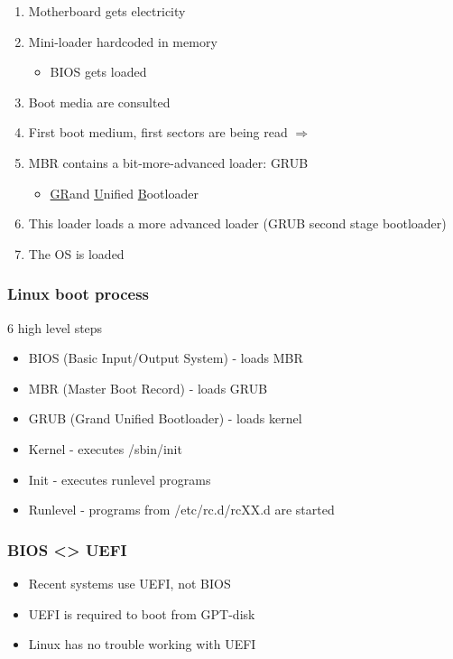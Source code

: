 \documentclass{article}
\begin{document}
\begin{enumerate}
    \item Motherboard gets electricity
    \item Mini-loader hardcoded in memory
    \begin{itemize}
        \item BIOS gets loaded
    \end{itemize}
    \item Boot media are consulted
    \item First boot medium, first sectors are being read $\Rightarrow$
    \item MBR contains a bit-more-advanced loader: GRUB
    \begin{itemize}
        \item \underline{GR}and \underline{U}nified \underline{B}ootloader
    \end{itemize}
    \item This loader loads a more advanced loader (GRUB second stage bootloader)
    \item The OS is loaded
\end{enumerate}

\subsubsection{Linux boot process}

6 high level steps

\begin{itemize}
    \item BIOS (Basic Input/Output System) - loads MBR
    \item MBR (Master Boot Record) - loads GRUB
    \item GRUB (Grand Unified Bootloader) - loads kernel
    \item Kernel - executes /sbin/init
    \item Init - executes runlevel programs
    \item Runlevel - programs from /etc/rc.d/rcXX.d are started
\end{itemize}

\subsubsection{BIOS <> UEFI}

\begin{itemize}
    \item Recent systems use UEFI, not BIOS
    \item UEFI is required to boot from GPT-disk
    \item Linux has no trouble working with UEFI
\end{itemize}
\end{document}
